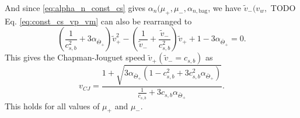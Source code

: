 And since \eqref{eq:alpha_n_const_cs} gives $\alpha_n(\mu_+, \mu_-, \alpha_{n,\text{bag}}$, we have $\tilde{v}_- (v_w,
$
TODO
Eq. \eqref{eq:const_cs_vp_vm} can also be rearranged to
\begin{equation}
\left( \frac{1}{c_{s,b}^2} + 3\alpha_{\bar{\Theta}_+} \right) \tilde{v}_+^2
- \left( \frac{1}{\tilde{v}_-} + \frac{\tilde{v}_-}{c_{s,b}^2} \right) \tilde{v}_+
+ 1 - 3\alpha_{\bar{\Theta}_+}
= 0.
\end{equation}
This gives the Chapman-Jouguet speed $\tilde{v}_+ \left( \tilde{v}_- = c_{s,b} \right)$ as
\cite[eq. 55]{giese_2020}
\begin{equation}
v_{CJ} = \frac{ 1 + \sqrt{ 3\alpha_{\bar{\Theta}_+} ( 1 - c_{s,b}^2 + 3 c_{s,b}^2 \alpha_{\bar{\Theta}_+} ) }}{ \frac{1}{c_{s,b}} + 3 c_{s,b} \alpha_{\bar{\Theta}_+}}.
\end{equation}
This holds for all values of $\mu_+$ and $\mu_-$.
